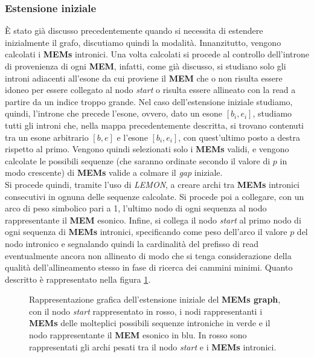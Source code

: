 \documentclass[a4paper,12pt, oneside]{book}
\begin{document}
\subsubsection{Estensione iniziale}
È stato già discusso precedentemente quando si necessita di estendere
inizialmente il grafo, discutiamo quindi la modalità. Innanzitutto, vengono
calcolati i \textbf{MEMs} intronici. Una volta calcolati si procede al controllo
dell'introne di provenienza di ogni \textbf{MEM}, infatti, come già discusso,
si studiano solo gli introni adiacenti 
all'esone da cui proviene il \textbf{MEM} che o non risulta essere idoneo per
essere collegato al nodo \textit{start} o risulta essere allineato con la read a
partire da un indice troppo grande. Nel caso dell'estensione iniziale studiamo,
quindi,
l'introne che precede l'esone, ovvero, dato un esone $[b_i,e_i]$, studiamo tutti
gli introni che, nella mappa precedentemente descritta, si trovano contenuti tra
un esone arbitrario $[b,e]$ e l'esone $[b_i,e_i]$, con quest'ultimo posto a
destra rispetto al primo. Vengono quindi selezionati solo i \textbf{MEMs}
validi, 
e vengono calcolate le possibili sequenze (che saranno ordinate secondo il
valore di $p$ in modo crescente) di \textbf{MEMs} valide a colmare il
\textit{gap} iniziale.\\
Si procede quindi, tramite l'uso di \textit{LEMON}, a creare archi tra
\textbf{MEMs} intronici consecutivi in ognuna delle sequenze calcolate. Si
procede poi a collegare, con un arco di peso simbolico pari a 1, l'ultimo nodo
di ogni sequenza al nodo rappresentante il \textbf{MEM} esonico. Infine, si
collega il nodo \textit{start} al primo nodo di ogni sequenza di \textbf{MEMs}
intronici, specificando come peso dell'arco il valore $p$ del nodo 
intronico e segnalando quindi la cardinalità del prefisso di read
eventualmente ancora non allineato di modo che si tenga considerazione della
qualità dell'allineamento stesso in fase di ricerca dei cammini minimi. Quanto
descritto è rappresentato nella figura \ref{in}.
\begin{figure}
  \centering
  
  \caption{Rappresentazione grafica dell'estensione iniziale del \textbf{MEMs
      graph}, con il nodo \textit{start} rappresentato in rosso, i nodi
    rappresentanti i \textbf{MEMs} delle molteplici possibili sequenze
    introniche in verde e il nodo rappresentante il \textbf{MEM} esonico in blu.
    In rosso sono rappresentati gli archi pesati tra il
    nodo \textit{start} e i \textbf{MEMs} intronici.}
  \label{in}
\end{figure}
\end{document}
